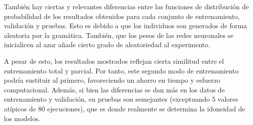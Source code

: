 \documentclass[spanish,a4paper,12pt,twoside]{report}
\begin{document}
  También hay ciertas y relevantes diferencias entre las funciones de distribución de probabilidad de los resultados obtenidos para cada conjunto de entrenamiento, validación y pruebas. Esto es debido a que los individuos son generados de forma aleatoria por la gramática. También, que los pesos de las redes neuronales se inicialicen al azar añade cierto grado de aleatoriedad al experimento. \par
  A pesar de esto, los resultados mostrados reflejan cierta similitud entre el entrenamiento total y parcial. Por tanto, este segundo modo de entrenamiento podría sustituir al primero, favoreciendo un ahorro en tiempo y esfuerzo computacional. Además, si bien las diferencias se dan más en los datos de entrenamiento y validación, en pruebas son semejantes (exceptuando 5 valores atípicos de 80 ejecuciones), que es donde realmente se determina la idoneidad de los modelos.
  
\end{document}
